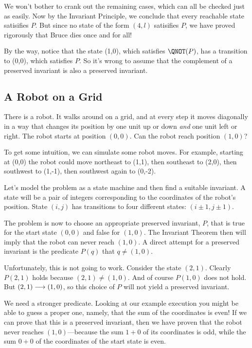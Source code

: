 We won't bother to crank out the remaining cases, which can all be checked
just as easily.  Now by the Invariant Principle, we conclude that every
reachable state satisifies $P$.  But since no state of the form $(4,l)$
satisifies $P$, we have proved rigorously that Bruce dies once and for
all!

By the way, notice that the state (1,0), which satisfies $\QNOT(P)$, has a
transition to (0,0), which satisfies $P$.  So it's wrong to assume that
the complement of a preserved invariant is also a preserved invariant.

\subsection{A Robot on a Grid}

There is a robot.  It walks around on a grid, and at every step it moves
diagonally in a way that changes its position by one unit up or down
\emph{and} one unit left or right.  The robot starts at position $(0, 0)$.
Can the robot reach position $(1, 0)$?

To get some intuition, we can simulate some robot moves.  For example,
starting at (0,0) the robot could move northeast to (1,1), then southeast
to (2,0), then southwest to (1,-1), then southwest again to (0,-2).

Let's model the problem as a state machine and then find a suitable
invariant.  A state will be a pair of integers corresponding to the
coordinates of the robot's position.  State $(i,j)$ has transitions to
four different states: $(i \pm 1, j \pm 1)$.

The problem is now to choose an appropriate preserved invariant, $P$, that
is true for the start state $(0,0)$ and false for $(1, 0)$.  The Invariant
Theorem then will imply that the robot can never reach $(1, 0)$.  A direct
attempt for a preserved invariant is the predicate $P(q)$ that $q \neq (1,
0)$.

Unfortunately, this is not going to work.  Consider the state $(2,1)$.
Clearly $P(2,1)$ holds because $(2,1) \neq (1, 0)$.  And of course
$P(1,0)$ does not hold.  But $(2,1) \mathrel{\longrightarrow} (1,0)$, so this choice of $P$
will not yield a preserved invariant.

We need a stronger predicate.  Looking at our example execution you might
be able to guess a proper one, namely, that the sum of the coordinates is
even!  If we can prove that this is a preserved invariant, then we have
proven that the robot never reaches $(1, 0)$---because the sum $1+0$ of
its coordinates is odd, while the sum $0+0$ of the coordinates of the
start state is even.

